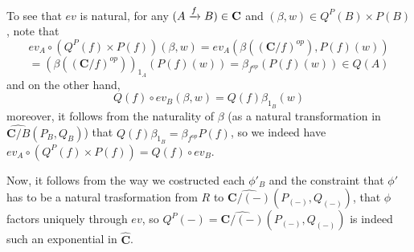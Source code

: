 To see that $ev$ is natural, for any $(A\xrightarrow{f}B)\in\mathbf{C}$ and $(\beta,w)\in Q^P(B)\times P(B)$, note that
\[ev_A\circ (Q^P(f)\times P(f))(\beta,w)=ev_A(\beta((\mathbf{C}/f)^{op}),P(f)(w))\]
\[=(\beta((\mathbf{C}/f)^{op}))_{1_A}(P(f)(w))=\beta_{f^{op}}(P(f)(w))\in Q(A)\]
and on the other hand,
\[Q(f)\circ ev_B(\beta,w)=Q(f)\beta_{1_B}(w)\]
moreover, it follows from the naturality of $\beta$ (as a natural transformation in $\widehat{\mathbf{C}/B}(P_B,Q_B)$) that $Q(f)\beta_{1_B}=\beta_{f^{op}}P(f)$, so we indeed have $ev_A\circ (Q^P(f)\times P(f))=Q(f)\circ ev_B$.

Now, it follows from the way we costructed each $\phi'_B$ and the constraint that $\phi'$ has to be a natural trasformation from $R$ to $\widehat{\mathbf{C}/(-)}(P_{(-)},Q_{(-)})$, that $\phi$ factors uniquely through $ev$, so $Q^P(-)=\widehat{\mathbf{C}/(-)}(P_{(-)},Q_{(-)})$ is indeed such an exponential in $\widehat{\mathbf{C}}$.